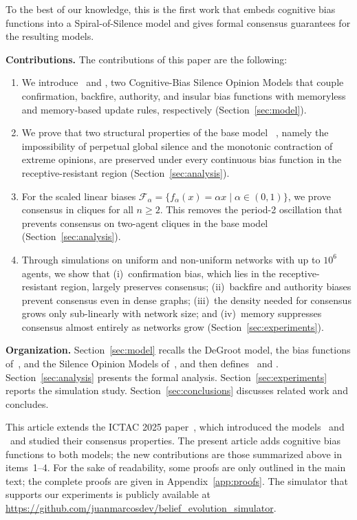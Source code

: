 To the best of our knowledge, this is the first work that embeds cognitive
bias functions into a Spiral-of-Silence model and gives formal consensus
guarantees for the resulting models.

\noindent\textbf{Contributions.} The contributions of this paper are the
following:

\begin{enumerate}

  \item We introduce \CBSOMminus\ and \CBSOMplus, two Cognitive-Bias Silence
    Opinion Models that couple confirmation, backfire, authority, and insular
    bias functions with memoryless and memory-based update rules,
    respectively (Section~\ref{sec:model}).

  \item We prove that two structural properties of the base model
    \SOMminus~\cite{aranda2024sound}, namely the impossibility of perpetual
    global silence and the monotonic contraction of extreme opinions, are
    preserved under every continuous bias function in the
    receptive-resistant region (Section~\ref{sec:analysis}).

  \item For the scaled linear biases
    $\mathcal{F}_\alpha = \{f_\alpha(x)=\alpha x \mid \alpha\in(0,1)\}$,
    we prove consensus in cliques for all $n\ge 2$. This removes the period-2
    oscillation that prevents consensus on two-agent cliques in the base
    model (Section~\ref{sec:analysis}).

  \item Through simulations on uniform and non-uniform networks with up to
    $10^{6}$ agents, we show that (i)~confirmation bias, which lies in the
    receptive-resistant region, largely preserves consensus; (ii)~backfire and
    authority biases prevent consensus even in dense graphs; (iii)~the density
    needed for consensus grows only sub-linearly with network size; and
    (iv)~memory suppresses consensus almost entirely as networks grow
    (Section~\ref{sec:experiments}).

\end{enumerate}

\noindent\textbf{Organization.}
Section~\ref{sec:model} recalls the DeGroot model, the bias functions
of~\cite{Alvim2024}, and the Silence Opinion Models
of~\cite{aranda2024sound}, and then defines \CBSOMminus\ and \CBSOMplus.
Section~\ref{sec:analysis} presents the formal analysis.
Section~\ref{sec:experiments} reports the simulation study.
Section~\ref{sec:conclusions} discusses related work and concludes.

This article extends the ICTAC 2025 paper~\cite{aranda2024sound}, which
introduced the models \SOMminus\ and \SOMplus\ and studied their consensus
properties. The present article adds cognitive bias functions to both
models; the new contributions are those summarized above in
items~1--4. For the sake of readability, some proofs are only outlined in the main text;
the complete proofs are given in Appendix~\ref{app:proofs}. The simulator that
supports our experiments is publicly available at
\url{https://github.com/juanmarcosdev/belief_evolution_simulator}.

